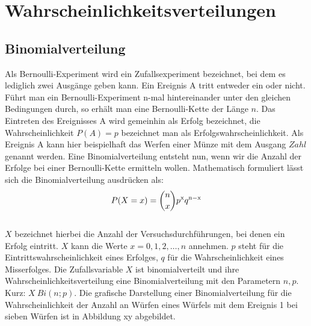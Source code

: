 \section{Wahrscheinlichkeitsverteilungen}
\label{sec.Wahrscheinlichkeitsverteilungen}
\subsection{Binomialverteilung}
\label{sec.Binomialverteilung}
Als Bernoulli-Experiment wird ein Zufallsexperiment bezeichnet, bei dem es lediglich zwei Ausgänge geben kann. Ein Ereignis A tritt entweder ein oder nicht. Führt man ein Bernoulli-Experiment n-mal hintereinander unter den gleichen Bedingungen durch, so erhält man eine Bernoulli-Kette der Länge $n$. Das Eintreten des Ereignisses A wird gemeinhin als Erfolg bezeichnet, die Wahrscheinlichkeit $P(A)=p$ bezeichnet man als Erfolgswahrscheinlichkeit. Als Ereignis A kann hier beispielhaft das Werfen einer Münze mit dem Ausgang $Zahl$ genannt werden. Eine Binomialverteilung entsteht nun, wenn wir die Anzahl der Erfolge bei einer Bernoulli-Kette ermitteln wollen. Mathematisch formuliert lässt sich die Binomialverteilung ausdrücken als:
\begin{equation}
	\label{eq:Binomialverteilung}
	P(X=x) = \binom{n}{x}p^{\mathrm{x}} q^{\mathrm{n-x}}
\end{equation}\\
$X$ bezeichnet hierbei die Anzahl der Versuchsdurchführungen, bei denen ein Erfolg eintritt. $X$ kann die Werte $x = 0,1,2,\dots,n$ annehmen. $p$ steht für die Eintrittswahrscheinlichkeit eines Erfolges, $q$ für die Wahrscheinlichkeit eines Misserfolges. Die Zufallsvariable $X$ ist binomialverteilt und ihre Wahrscheinlichkeitsverteilung eine Binomialverteilung mit den Parametern $n,p$. Kurz: $X~Bi(n;p)$. Die grafische Darstellung einer Binomialverteilung für die Wahrscheinlichkeit der Anzahl an Würfen eines Würfels mit dem Ereignis 1 bei sieben Würfen ist in Abbildung xy abgebildet.
